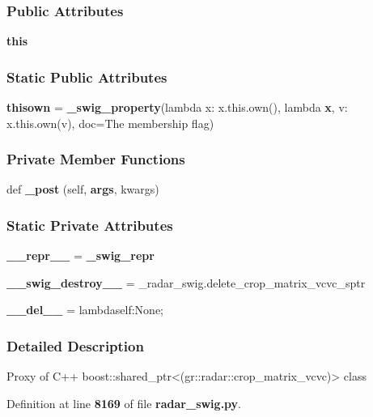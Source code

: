 \subsubsection*{Public Attributes}
\begin{DoxyCompactItemize}
\item 
{\bf this}
\end{DoxyCompactItemize}
\subsubsection*{Static Public Attributes}
\begin{DoxyCompactItemize}
\item 
{\bf thisown} = {\bf \+\_\+swig\+\_\+property}(lambda x\+: x.\+this.\+own(), lambda {\bf x}, v\+: x.\+this.\+own(v), doc=\textquotesingle{}The membership flag\textquotesingle{})
\end{DoxyCompactItemize}
\subsubsection*{Private Member Functions}
\begin{DoxyCompactItemize}
\item 
def {\bf \+\_\+post} (self, {\bf args}, kwargs)
\end{DoxyCompactItemize}
\subsubsection*{Static Private Attributes}
\begin{DoxyCompactItemize}
\item 
{\bf \+\_\+\+\_\+repr\+\_\+\+\_\+} = {\bf \+\_\+swig\+\_\+repr}
\item 
{\bf \+\_\+\+\_\+swig\+\_\+destroy\+\_\+\+\_\+} = \+\_\+radar\+\_\+swig.\+delete\+\_\+crop\+\_\+matrix\+\_\+vcvc\+\_\+sptr
\item 
{\bf \+\_\+\+\_\+del\+\_\+\+\_\+} = lambdaself\+:\+None;
\end{DoxyCompactItemize}


\subsubsection{Detailed Description}
\begin{DoxyVerb}Proxy of C++ boost::shared_ptr<(gr::radar::crop_matrix_vcvc)> class\end{DoxyVerb}
 

Definition at line {\bf 8169} of file {\bf radar\+\_\+swig.\+py}.



